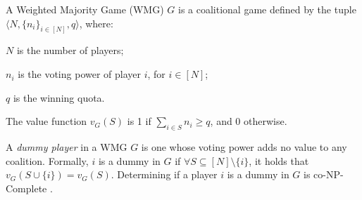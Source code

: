 \begin{definition} \label{def:wmg}
A Weighted Majority Game (WMG) $G$ is a coalitional game defined by the tuple $  \langle N,\{n_{i}\}_{i \in [N]}, q\rangle$, where: \begin{inparaenum}[(i)] \item $N$ is the number of players; \item $n_{i}$ is the voting power of player $i$, for $i \in [N]$; \item $q$ is the winning quota. \end{inparaenum} The value function $v_{G}(S)$ is 1 if $\sum_{i \in S} n_{i} \geq q$, and 0 otherwise.

\end{definition}


A \emph{dummy player} in a WMG $G$ is one whose voting power adds no value to any coalition. Formally, $i$ is a dummy in $G$ if $\forall S \subseteq [N] \setminus \{i\}$, it holds that $v_{G}(S \cup \{i\}) = v_{G}(S)$. Determining if a player $i$ is a dummy in $G$ is co-NP-Complete \citep{freixas2011complexity}.


